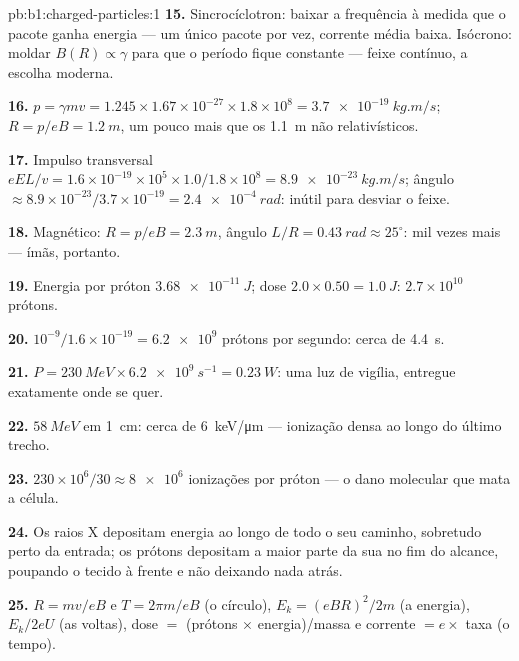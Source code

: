 \begin{solution}{pb:b1:charged-particles:1}
\textbf{15.} Sincrocíclotron: baixar a frequência à medida que o pacote ganha
energia --- um único pacote por vez, corrente média baixa. Isócrono:
moldar $B(R) \propto \gamma$ para que o período fique constante --- feixe
contínuo, a escolha moderna.

\textbf{16.} $p = \gamma mv = 1.245 \times 1.67\times10^{-27} \times 1.8\times10^8
= \qty{3.7e-19}{kg.m/s}$; $R = p/eB = \qty{1.2}{m}$, um pouco mais que
os \qty{1.1}{m} não relativísticos.

\textbf{17.} Impulso transversal $eEL/v = 1.6\times10^{-19} \times 10^5 \times
1.0/1.8\times10^8 = \qty{8.9e-23}{kg.m/s}$; ângulo $\approx 8.9\times10^{-23}/
3.7\times10^{-19} = \qty{2.4e-4}{rad}$: inútil para desviar o feixe.

\textbf{18.} Magnético: $R = p/eB = \qty{2.3}{m}$, ângulo $L/R = \qty{0.43}{rad}
\approx 25^\circ$: mil vezes mais --- ímãs, portanto.

\textbf{19.} Energia por próton $\qty{3.68e-11}{J}$; dose $2.0 \times 0.50 =
\qty{1.0}{J}$: $2.7\times10^{10}$ prótons.

\textbf{20.} $10^{-9}/1.6\times10^{-19} = \num{6.2e9}$ prótons por segundo: cerca de
\qty{4.4}{s}.

\textbf{21.} $P = \qty{230}{MeV} \times \qty{6.2e9}{s^{-1}} = \qty{0.23}{W}$:
uma luz de vigília, entregue exatamente onde se quer.

\textbf{22.} $\qty{58}{MeV}$ em \qty{1}{cm}: cerca de \qty{6}{keV/\micro m} ---
ionização densa ao longo do último trecho.

\textbf{23.} $230\times10^6/30 \approx \num{8e6}$ ionizações por próton ---
o dano molecular que mata a célula.

\textbf{24.} Os raios X depositam energia ao longo de todo o seu caminho, sobretudo perto da
entrada; os prótons depositam a maior parte da sua no fim do alcance,
poupando o tecido à frente e não deixando nada atrás.

\textbf{25.} $R = mv/eB$ e $T = 2\pi m/eB$ (o círculo), $E_k = (eBR)^2/2m$
(a energia), $E_k/2eU$ (as voltas), dose $=$ (prótons $\times$ energia)/massa
e corrente $= e \times$ taxa (o tempo).
\end{solution}
